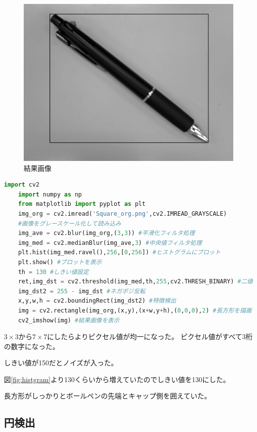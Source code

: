 \documentclass{jlreq}
\begin{document}
\begin{figure}[htbp]
\begin{minipage}{0.23\linewidth}
		\includegraphics[width=\linewidth]{Image/img_res.png}
		\caption{結果画像} \label{fig:img_res}
	\end{minipage}
\end{figure}

\begin{lstlisting}[caption={物体検出のソースコード},language=Python,label=src:SquareCode]
	import cv2
	import numpy as np 
	from matplotlib import pyplot as plt
	img_org = cv2.imread('Square_org.png',cv2.IMREAD_GRAYSCALE)
	#画像をグレースケール化して読み込み
	img_ave = cv2.blur(img_org,(3,3)) #平滑化フィルタ処理
	img_med = cv2.medianBlur(img_ave,3) #中央値フィルタ処理
	plt.hist(img_med.ravel(),256,[0,256]) #ヒストグラムにプロット
	plt.show() #プロットを表示
	th = 130 #しきい値設定
	ret,img_dst = cv2.threshold(img_med,th,255,cv2.THRESH_BINARY) #二値化処理
	img_dst2 = 255 - img_dst #ネガポジ反転
	x,y,w,h = cv2.boundingRect(img_dst2) #特徴検出
	img = cv2.rectangle(img_org,(x,y),(x+w,y+h),(0,0,0),2) #長方形を描画
	cv2_imshow(img) #結果画像を表示
\end{lstlisting}
\(3\times3\)から\(7\times7\)にしたらよりピクセル値が均一になった。
ピクセル値がすべて3桁の数字になった。

しきい値が150だとノイズが入った。

図\ref{fig:histgram}より130くらいから増えていたのでしきい値を130にした。

長方形がしっかりとボールペンの先端とキャップ側を囲えていた。


\subsection{円検出}
\end{document}
